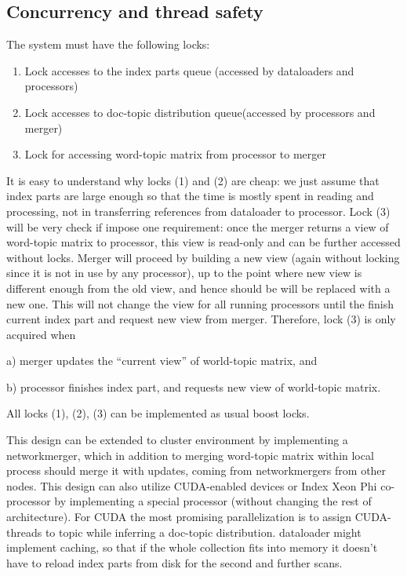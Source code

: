 \documentclass[11pt,a4paper,twoside]{report}
\begin{document}
\subsection{Concurrency and thread safety}
The system must have the following locks:
\begin{enumerate}
    \item Lock accesses to the index parts queue (accessed by dataloaders and processors)
    \item Lock accesses to doc-topic distribution queue(accessed by processors and merger)
    \item Lock for accessing word-topic matrix from processor to merger
\end{enumerate}

It is easy to understand why locks (1) and (2) are cheap:
we just assume that index parts are large enough so that the time is mostly spent in reading and processing,
not in transferring references from dataloader to processor.
Lock (3) will be very check if impose one requirement:
once the merger returns a view of word-topic matrix to processor,
this view is read-only and can be further accessed without locks.
Merger will proceed by building a new view (again without locking since it is not in use by any processor),
up to the point where new view is different enough from the old view,
and hence should be will be replaced with a new one.
This will not change the view for all running processors
until the finish current index part and request new view from merger.
Therefore, lock (3) is only acquired when

a) merger updates the “current view” of world-topic matrix, and

b) processor finishes index part, and requests new view of world-topic matrix.

All locks (1), (2), (3) can be implemented as usual boost locks.

This design can be extended to cluster environment by implementing a networkmerger,
which in addition to merging word-topic matrix within local process should merge it with updates,
coming from networkmergers from other nodes.
This design can also utilize CUDA-enabled devices or Index Xeon Phi co-processor
by implementing a special processor (without changing the rest of architecture).
For CUDA the most promising parallelization is to assign CUDA-threads to topic
while inferring a doc-topic distribution.
dataloader might implement caching, so that if the whole collection fits into memory
it doesn’t have to reload index parts from disk for the second and further scans.
\end{document}
